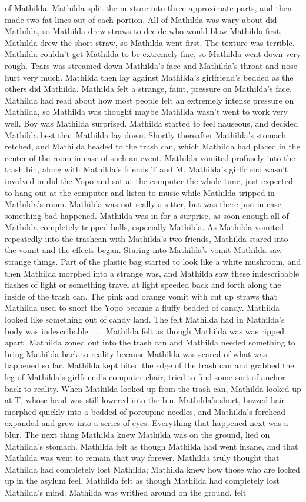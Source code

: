 \documentclass[12pt]{book}
\begin{document}
of Mathilda. Mathilda split the mixture into three approximate parts, and then made two fat lines out of each portion. All of Mathilda was wary about did Mathilda, so Mathilda drew straws to decide who would blow Mathilda first. Mathilda drew the short straw, so Mathilda went first. The texture was terrible. Mathilda couldn't get Mathilda to be extremely fine, so Mathilda went down very rough. Tears was streamed down Mathilda's face and Mathilda's throat and nose hurt very much. Mathilda then lay against Mathilda's girlfriend's bedded as the others did Mathilda. Mathilda felt a strange, faint, pressure on Mathilda's face. Mathilda had read about how most people felt an extremely intense pressure on Mathilda, so Mathilda was thought maybe Mathilda wasn't went to work very well. Boy was Mathilda surprised. Mathilda started to feel nauseous, and decided Mathilda best that Mathilda lay down. Shortly thereafter Mathilda's stomach retched, and Mathilda headed to the trash can, which Mathilda had placed in the center of the room in case of such an event. Mathilda vomited profusely into the trash bin, along with Mathilda's friends T and M. Mathilda's girlfriend wasn't involved in did the Yopo and sat at the computer the whole time, just expected to hang out at the computer and listen to music while Mathilda tripped in Mathilda's room. Mathilda was not really a sitter, but was there just in case something bad happened. Mathilda was in for a surprise, as soon enough all of Mathilda completely tripped balls, especially Mathilda. As Mathilda vomited repeatedly into the trashcan with Mathilda's two friends, Mathilda stared into the vomit and the effects began. Staring into Mathilda's vomit Mathilda saw strange things. Part of the plastic bag started to look like a white mushroom, and then Mathilda morphed into a strange was, and Mathilda saw these indescribable flashes of light or something travel at light speeded back and forth along the inside of the trash can. The pink and orange vomit with cut up straws that Mathilda used to snort the Yopo became a fluffy bedded of candy. Mathilda looked like something out of candy land. The felt Mathilda had in Mathilda's body was indescribable . . .  Mathilda felt as though Mathilda was was ripped apart. Mathilda zoned out into the trash can and Mathilda needed something to bring Mathilda back to reality because Mathilda was scared of what was happened so far. Mathilda kept bited the edge of the trash can and grabbed the leg of Mathilda's girlfriend's computer chair, tried to find some sort of anchor back to reality. When Mathilda looked up from the trash can, Mathilda looked up at T, whose head was still lowered into the bin. Mathilda's short, buzzed hair morphed quickly into a bedded of porcupine needles, and Mathilda's forehead expanded and grew into a series of eyes. Everything that happened next was a blur. The next thing Mathilda knew Mathilda was on the ground, lied on Mathilda's stomach. Mathilda felt as though Mathilda had went insane, and that Mathilda was went to remain that way forever. Mathilda truly thought that Mathilda had completely lost Mathilda; Mathilda knew how those who are locked up in the asylum feel. Mathilda felt as though Mathilda had completely lost Mathilda's mind. Mathilda was writhed around on the ground, felt 
\end{document}
